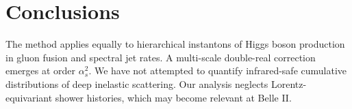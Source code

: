 \section{Conclusions}\label{sec:conclusions}

The method applies equally to hierarchical instantons of Higgs boson
production in gluon fusion and spectral jet rates. A multi-scale
double-real correction emerges at order $\alpha_s^2$. We have not
attempted to quantify infrared-safe cumulative distributions of deep
inelastic scattering. Our analysis neglects Lorentz-equivariant shower
histories, which may become relevant at Belle II.

